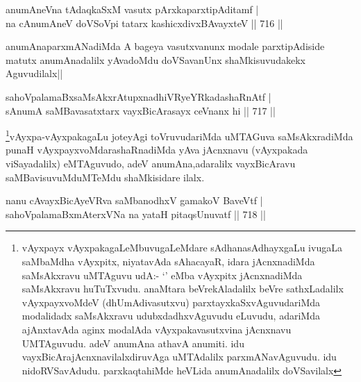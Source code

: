 \begin{shl}
anumAneVna tAdaqkaSxM vasutx pArxkaparxtipAditamf | \\
na cAnumAneV doVSoV\s pi tatarx kashicxdivxBAvayxteV \hfill||  716 ||  
\end{shl}

\begin{artha}
anumAnaparxmANadiMda A bageya vasutxvanunx modale parxtipAdiside matutx anumAnadalilx yAvadoMdu doVSavanUnx shaMkisuvudakekx Aguvudilalx||
\end{artha}


\begin{shl}
sahoVpalamaBxsaMsAkxrAtupxnadhiVRyeYRkadashaRnAtf | \\
sA\s numA saMBavasatxtarx vayxBicArasayx ceVnanx hi \hfill||  717 ||  
\end{shl}

\begin{artha}
\footnote{vAyxpayx vAyxpakagaLeMbuvugaLeMdare sAdhanasAdhayxgaLu ivugaLa saMbaMdha vAyxpitx, niyatavAda sAhacayaR, idara jAcnxnadiMda saMsAkxravu uMTAguvu udA:- `\stext' eMba vAyxpitx jAcnxnadiMda saMsAkxravu huTuTxvudu. anaMtara beVrekAladalilx  beVre sathxLadalilx vAyxpayxvoMdeV (dhUmAdivasutxvu) parxtayxkaSxvAguvudariMda modalidadx saMsAkxravu udubxdadhxvAguvudu eLuvudu, adariMda ajAnxtavAda aginx modalAda vAyxpakavasutxvina jAcnxnavu UMTAguvudu. adeV anumAna athavA anumiti. idu vayxBicArajAcnxnavilalxdiruvAga uMTAdalilx parxmANavAguvudu. idu nidoRVSavAdudu. parxkaqtahiMde heVLida anumAnadalilx doVSavilalx}vAyxpa-vAyxpakagaLu joteyAgi toVruvudariMda uMTAGuva saMsAkxradiMda punaH vAyxpayxvoMdarashaRnadiMda yAva jAcnxnavu (vAyxpakada viSayadalilx) eMTAguvudo, adeV anumAna,adaralilx vayxBicAravu saMBavisuvuMduMTeMdu shaMkisidare ilalx.
\end{artha}


\begin{shl}
nanu cAvayxBicAyeVRva saMbanodhxV gamakoV BaveVtf | \\
sahoVpalamaBxmAterxVNa na yataH pitaqsUnuvatf \hfill||  718 ||  
\end{shl}

